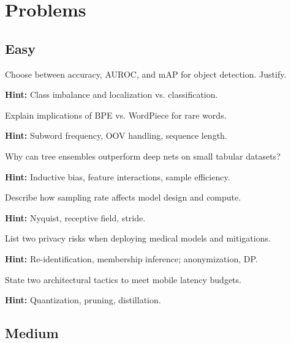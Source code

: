 
\section*{Problems}

\subsection*{Easy}

\begin{problem}
Choose between accuracy, AUROC, and mAP for object detection. Justify.

\textbf{Hint:} Class imbalance and localization vs. classification.
\end{problem}

\begin{problem}
Explain implications of BPE vs. WordPiece for rare words.

\textbf{Hint:} Subword frequency, OOV handling, sequence length.
\end{problem}

\begin{problem}
Why can tree ensembles outperform deep nets on small tabular datasets?

\textbf{Hint:} Inductive bias, feature interactions, sample efficiency.
\end{problem}

\begin{problem}
Describe how sampling rate affects model design and compute.

\textbf{Hint:} Nyquist, receptive field, stride.
\end{problem}

\begin{problem}
List two privacy risks when deploying medical models and mitigations.

\textbf{Hint:} Re-identification, membership inference; anonymization, DP.
\end{problem}

\begin{problem}
State two architectural tactics to meet mobile latency budgets.

\textbf{Hint:} Quantization, pruning, distillation.
\end{problem}

\subsection*{Medium}

